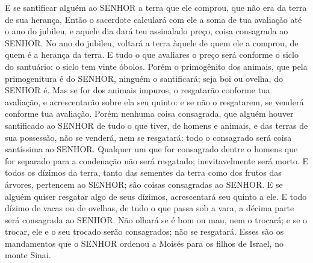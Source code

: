 {{  E se santificar alguém ao SENHOR a terra que ele comprou, que não era da terra de sua herança,
  Então o sacerdote calculará com ele a soma de tua avaliação até o ano do jubileu, e aquele dia dará teu assinalado preço, coisa consagrada ao SENHOR.
  No ano do jubileu, voltará a terra àquele de quem ele a comprou, de quem é a herança da terra. %
  E tudo o que avaliares o preço será conforme o siclo do santuário: o siclo tem vinte óbolos.
  Porém o primogênito dos animais, que pela primogenitura é do SENHOR, ninguém o santificará; seja boi ou ovelha, do SENHOR é.
  Mas se for dos animais impuros, o resgatarão conforme tua avaliação, e acrescentarão sobre ela seu quinto: e se não o resgatarem, se venderá conforme tua avaliação.
  Porém nenhuma coisa consagrada, que alguém houver santificado ao SENHOR de tudo o que tiver, de homens e animais, e das terras de sua possessão, não se venderá, nem se resgatará: todo o consagrado será coisa santíssima ao SENHOR.
  Qualquer um que for consagrado dentre o homens que for separado para a condenação não será resgatado; inevitavelmente será morto.
  E todos os dízimos da terra, tanto das sementes da terra como dos frutos das árvores, pertencem ao SENHOR; são coisas consagradas ao SENHOR.
  E se alguém quiser resgatar algo de seus dízimos, acrescentará seu quinto a ele.
  E todo dízimo de vacas ou de ovelhas, de tudo o que passa sob a vara, a décima parte será consagrada ao SENHOR.
  Não olhará se é bom ou mau, nem o trocará; e se o trocar, ele e o seu trocado serão consagrados; não se resgatará}.
  Esses são os mandamentos que o SENHOR ordenou a Moisés para os filhos de Israel, no monte Sinai.\par }

